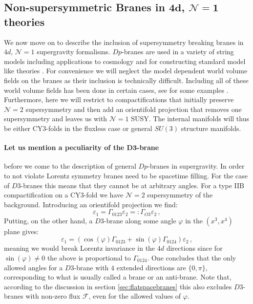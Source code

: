 \documentclass[a4paper,12pt,twoside,openright]{report}
\newcommand{\be}{\begin{equation}}
\newcommand{\ee}{\end{equation}}
\begin{document}
\subsection[Non-supersymmetric Branes in $4d$, $\mathcal{N}=1$ Theories]{Non-supersymmetric Branes in $\mathbf{4d}$, $\mathbf{\mathcal{N}=1}$ theories}
We now move on to describe the inclusion of supersymmetry breaking branes in $4d$, $\mathcal{N}=1$ supergravity formalisms. $Dp$-branes are used in a variety of string models including applications to cosmology \cite{Grana:2005jc,Douglas:2006es} and for constructing standard model like theories \cite{Blumenhagen:2006ci,Blumenhagen:2005mu}. For convenience we will neglect the model dependent world volume fields on the branes as their inclusion is technically difficult. Including all of these world volume fields has been done in certain cases, see for some examples \cite{Vercnocke:2016fbt,Kallosh:2016aep,Kachru:2003aw,Aalsma:2017ulu,GarciadelMoral:2017vnz,Cribiori:2019hod}. Furthermore, here we will restrict to compactifications that initially preserve $\mathcal{N}=2$ supersymmetry and then add an orientifold projection that removes one supersymmetry and leaves us with $\mathcal{N}=1$ SUSY. The internal manifolds will thus be either CY3-folds in the fluxless case or general $SU(3)$ structure manifolds. 
\paragraph{Let us mention a peculiarity of the $\mathbf{D3}$-brane} before we come to the description of general $Dp$-branes in supergravity. In order to not violate Lorentz symmetry branes need to be spacetime filling. For the case of $D3$-branes this means that they cannot be at arbitrary angles. For a type IIB compactification on a CY3-fold we have $\mathcal{N}=2$ supersymmetry of the background. Introducing an orientifold projection we find:
\be
\varepsilon_1 = \Gamma_{0123}\varepsilon_2 =: \Gamma_{O3} \varepsilon_2\,,
\ee
Putting, on the other hand, a $D3$-brane along some angle $\varphi$ in the $(x^3,x^4)$ plane gives:
\be 
\varepsilon_1 = \left( \cos (\varphi) \Gamma_{0123} + \sin (\varphi) \Gamma_{0124} \right) \varepsilon_2\,,
\ee
meaning we would break Lorentz invariance in the $4d$ directions since for $\sin (\varphi)\neq0$ the above is proportional to $\Gamma_{0124}$. One concludes that the only allowed angles for a $D3$-brane with $4$ extended directions are $\{0,\pi\}$, corresponding to what is usually called a brane or an anti-brane. Note that, according to the discussion in section \ref{sec:flatspacebranes} this also excludes $D3$-branes with non-zero flux $\mathcal{F}$, even for the allowed values of $\varphi$.
\end{document}
